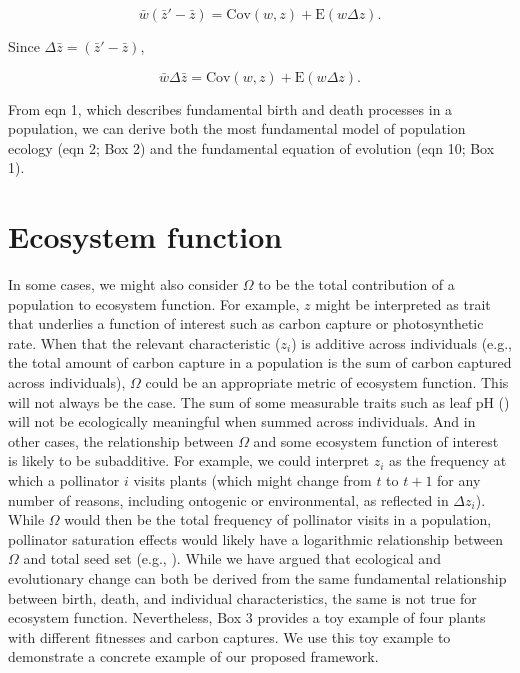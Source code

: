\documentclass[
]{article}
\begin{document}
\[\bar{w}\left(\bar{z}' - \bar{z}\right) = \mathrm{Cov}\left(w ,z \right) + \mathrm{E}\left( w \Delta z  \right).\]

Since \(\Delta \bar{z} = \left(\bar{z}' - \bar{z}\right)\),

\[\bar{w}\Delta \bar{z} = \mathrm{Cov}\left(w ,z \right) + \mathrm{E}\left( w \Delta z  \right).
\tag{10}
\]

From eqn 1, which describes fundamental birth and death processes in a
population, we can derive both the most fundamental model of population
ecology (eqn 2; Box 2) and the fundamental equation of evolution (eqn
10; Box 1).

\section{Ecosystem function}\label{ecosystem-function}

In some cases, we might also consider \(\Omega\) to be the total
contribution of a population to ecosystem function. For example, \(z\)
might be interpreted as trait that underlies a function of interest such
as carbon capture or photosynthetic rate. When that the relevant
characteristic (\(z_{i}\)) is additive across individuals (e.g., the
total amount of carbon capture in a population is the sum of carbon
captured across individuals), \(\Omega\) could be an appropriate metric
of ecosystem function. This will not always be the case. The sum of some
measurable traits such as leaf pH
() will not be
ecologically meaningful when summed across individuals. And in other
cases, the relationship between \(\Omega\) and some ecosystem function
of interest is likely to be subadditive. For example, we could interpret
\(z_{i}\) as the frequency at which a pollinator \(i\) visits plants
(which might change from \(t\) to \(t+1\) for any number of reasons,
including ontogenic or environmental, as reflected in \(\Delta z_{i}\)).
While \(\Omega\) would then be the total frequency of pollinator visits
in a population, pollinator saturation effects would likely have a
logarithmic relationship between \(\Omega\) and total seed set (e.g.,
). While we have argued that
ecological and evolutionary change can both be derived from the same
fundamental relationship between birth, death, and individual
characteristics, the same is not true for ecosystem function.
Nevertheless, Box 3 provides a toy example of four plants with different
fitnesses and carbon captures. We use this toy example to demonstrate a
concrete example of our proposed framework.
\end{document}
